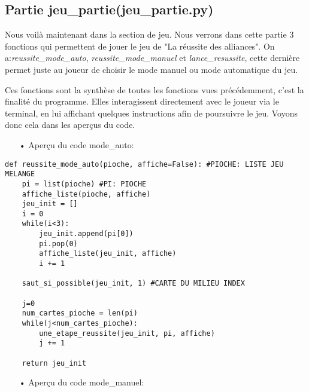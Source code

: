\subsection{Partie jeu\_partie(jeu\_partie.py)}
	Nous voilà maintenant dans la section de jeu. Nous verrons dans cette partie 3 fonctions qui permettent de jouer le jeu de "La réussite des alliances". On a:\emph{reussite\_mode\_auto}, \emph{reussite\_mode\_manuel} et \emph{lance\_resussite}, cette dernière permet juste au joueur de choisir le mode manuel ou mode automatique du jeu.
	\par Ces fonctions sont la synthèse de toutes les fonctions vues précédemment, c'est la finalité du programme. Elles interagissent directement avec le joueur via le terminal, en lui affichant quelques instructions afin de poursuivre le jeu. Voyons donc cela dans les aperçus du code.
	\\
	\begin{itemize}
	\color{blue}\item[•]Aperçu du code mode\_auto:
	\end{itemize}
	
	\lstset{language=Python}
	\lstset{frame=lines}
	\lstset{basicstyle=\footnotesize}
	\begin{lstlisting}
def reussite_mode_auto(pioche, affiche=False): #PIOCHE: LISTE JEU MELANGE
    pi = list(pioche) #PI: PIOCHE
    affiche_liste(pioche, affiche)
    jeu_init = []
    i = 0
    while(i<3):
        jeu_init.append(pi[0])
        pi.pop(0)
        affiche_liste(jeu_init, affiche)
        i += 1

    saut_si_possible(jeu_init, 1) #CARTE DU MILIEU INDEX

    j=0
    num_cartes_pioche = len(pi)
    while(j<num_cartes_pioche):
        une_etape_reussite(jeu_init, pi, affiche)
        j += 1
    
    return jeu_init
	\end{lstlisting}

	\begin{itemize}
	\color{blue}\item[•]Aperçu du code mode\_manuel:
	\end{itemize}
	

